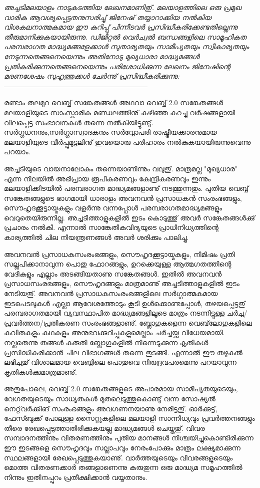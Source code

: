 \vskip 2pt

\textit{അച്ചടിമലയാളം നാടുകടത്തിയ ലേഖനമാണിതു്. മലയാളത്തിലെ ഒരു പ്രമുഖ വാരിക ആവശ്യപ്പെട്ടതനുസരിച്ചു് ജിനേഷ് 
തയ്യാറാക്കിയ നല്‍കിയ വിശകലനാത്മകമായ ഈ കുറിപ്പു് പിന്നീടവര്‍ പ്രസിദ്ധീകരിക്കേണ്ടതില്ലെന്നു തീരുമാനിക്കുകയായിരുന്നു.
 ഡിജിറ്റല്‍ വെര്‍ച്വല്‍ ബന്ധങ്ങളിലെ സാമൂഹികത പരമ്പരാഗത മാദ്ധ്യമങ്ങളേക്കാള്‍ സുതാര്യതയും സാമീപ്യതയും സ്വീകാര്യതയും 
നേടുന്നതെങ്ങനെയെന്നും അതിനോടു മുഖ്യധാരാ മാദ്ധ്യമങ്ങള്‍ പ്രതികരിക്കുന്നതെങ്ങനെയെന്നും പരിശോധിക്കുന്ന ലേഖനം 
ജിനേഷിന്റെ മരണശേഷം സുഹൃത്തുക്കള്‍ ചേര്‍ന്നു് പ്രസിദ്ധീകരിക്കുന്നു:}
--------------------------------------------------------------

രണ്ടാം തലമുറ വെബ്ബ് സങ്കേതങ്ങള്‍ അഥവാ വെബ്ബ് 2.0 സങ്കേതങ്ങള്‍ മലയാളിയുടെ സാംസ്കാരിക മണ്ഡലത്തിനു് കഴിഞ്ഞ കുറച്ചു 
വര്‍ഷങ്ങളായി വിലപ്പെട്ട സംഭാവനകള്‍ തന്നെ നല്‍കിയിട്ടുണ്ടു്. സര്‍ഗ്ഗധനനും,സര്‍ഗ്ഗാസ്വാദകനും സര്‍വ്വോപരി രാഷ്ട്രീയക്കാരനുമായ 
മലയാളിയുടെ വീര്‍പ്പുമുട്ടലിനു് ഇവയൊരു പരിഹാരം നല്‍കുകയായിരുന്നുവെന്നു പറയാം.

അച്ചടിയുടെ വായനാലോകം തന്നെയാണിന്നും വലുതു്. മാത്രമല്ല "മുഖ്യധാര" എന്ന നിലയില്‍ അഭിപ്രായ രൂപീകരണവും 
കേന്ദ്രീകരണവും ഇന്നും മലയാളിക്കിടയില്‍ പരമ്പരാഗത മാദ്ധ്യമങ്ങളാണു് നടത്തുന്നതും. പുതിയ വെബ്ബ് സങ്കേതങ്ങളുടെ ഭാഗമായി
 ധാരാളം അവനവന്‍ പ്രസാധകന്‍ സംരംഭങ്ങളും, സൌഹൃദക്കൂട്ടായ്മകളും വളര്‍ന്നു വന്നപ്പോള്‍ പരമ്പരാഗതമാദ്ധ്യമങ്ങളും 
വെറുതെയിരുന്നില്ല. അച്ചടിത്താളുകളില്‍ ഇടം കൊടുത്തു് അവര്‍ സങ്കേതങ്ങള്‍ക്കു് പ്രചാരം നല്‍കി. എന്നാല്‍ സാങ്കേതികവിദ്യയുടെ
 പ്രാധിനിധ്യത്തിന്റെ കാര്യത്തില്‍ ചില നിയന്ത്രണങ്ങള്‍ അവര്‍ ശരിക്കും പാലിച്ചു.

അവനവന്‍ പ്രസാധകസംരംഭങ്ങളും, സൌഹൃദക്കൂട്ടായ്മകളും, നിമിഷം പ്രതി സല്ലപിക്കാനാവുന്ന പൊതു ഫോറങ്ങളും, ഉറക്കെയുള്ള 
ആത്മഗതത്തിന്റെ വേദികളും എല്ലാം അടങ്ങിയതാണു സങ്കേതങ്ങള്‍. ഇതില്‍ അവനവന്‍ പ്രസാധസംരഭങ്ങളും, സൌഹൃദങ്ങളും
 മാത്രമാണു് അച്ചടിത്താളുകളില്‍ ഇടം നേടിയതു്. അവനവന്‍ പ്രസാധകസംരംഭങ്ങളിലെ സര്‍ഗ്ഗാത്മകമായ ഇടപെടലുകള്‍ എല്ലാ 
ആവേശത്തോടും കൂടി ഉള്‍ക്കൊണ്ടപ്പോള്‍, തഴയപ്പെട്ടതു് പരമ്പരാഗതമായി വ്യവസ്ഥാപിത മാദ്ധ്യമങ്ങളിലൂടെ മാത്രം നടന്നിട്ടുള്ള 
ചര്‍ച്ച/പ്രവര്‍ത്തന/പ്രതികരണ സംരംഭങ്ങളാണു്. ബ്ലോഗുകളെന്ന വെബ്‌ലോഗുകളിലെ കവിതകളും കഥകളും 
അനുഭവക്കുറിപ്പുകളുമെല്ലാം ചര്‍ച്ചയ്ക്കു വിധേയമായി. നല്ലതെന്നു തങ്ങള്‍ കരുതി ബ്ലോഗുകളില്‍ നിന്നെടുക്കുന്ന കൃതികള്‍ 
പ്രസിദ്ധീകരിക്കാന്‍ ചില വിഭാഗങ്ങള്‍ തന്നെ തുടങ്ങി. എന്നാല്‍ ഈ തഴുകല്‍ ലഭിച്ചതു് വിശാലമായ വെബ്ബിലെ പൊതുവെ 
നിരുദ്രവപരമെന്നു പറയാവുന്ന കൃതികള്‍ക്കുമാത്രമാണു്.

അതുപോലെ, വെബ്ബ് 2.0 സങ്കേതങ്ങളുടെ അപാരമായ സാമീപ്യതയുടെയും, വേഗതയുടെയും സാധ്യതകള്‍ മുതലെടുത്തുകൊണ്ടു് വന്ന
 സോഷ്യല്‍ നെറ്റ്‌വര്‍ക്കിങ് സംരംഭങ്ങളും അവഗണനയാണു നേരിട്ടതു്. ഓര്‍ക്കുട്ട്, ഫേസ്ബുക്ക് പോലുള്ള സൈറ്റുകളിലെ മലയാളി
 സാന്നിധ്യവും പ്രവര്‍ത്തനങ്ങളും തീരെ രേഖപ്പെടുത്താതിരിക്കുകയല്ല മാദ്ധ്യമങ്ങള്‍ ചെയ്തതു്. വിവര സമ്പാദനത്തിനും 
വിതരണത്തിനും പുതിയ മാനങ്ങള്‍ നിശ്ചയിച്ചുകൊണ്ടിരിക്കുന്ന ഈ ഇടങ്ങളെ സൌഹൃദവും സല്ലാപവും നേരംപോക്കും മാത്രം 
ലക്ഷ്യമാക്കുന്ന സ്ഥലങ്ങളായി രേഖപ്പെടുത്തുകയാണു്. വാര്‍ത്തയുടെയും വിവരങ്ങളുടെയും മൊത്ത വിതരണക്കാര്‍ തങ്ങളാണെന്നു
 കരുതുന്ന ഒരു മാദ്ധ്യമ സമൂഹത്തില്‍ നിന്നും ഇതിനപ്പുറം പ്രതീക്ഷിക്കാന്‍ വയ്യതാനും.

